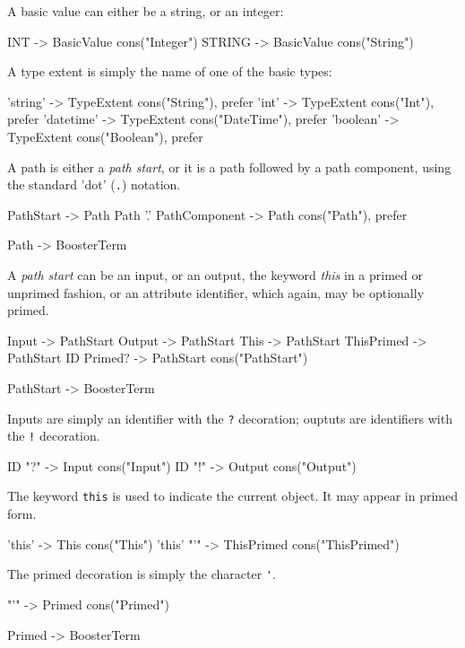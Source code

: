 A basic value can either be a string, or an integer:
\begin{code}
INT 		-> BasicValue {cons("Integer")}
STRING		-> BasicValue {cons("String")}
\end{code}

A type extent is simply the name of one of the basic types:
\begin{code}
'string'	-> TypeExtent {cons("String"), prefer}
'int'		-> TypeExtent {cons("Int"), prefer}
'datetime'	-> TypeExtent {cons("DateTime"), prefer}
'boolean'	-> TypeExtent {cons("Boolean"), prefer}
\end{code}

A path is either a \emph{path start}, or it is a path followed by a
path component, using the standard 'dot' (\verb|.|) notation.

\begin{code}
PathStart -> Path
Path '.' PathComponent -> Path {cons("Path"), prefer}

Path -> BoosterTerm
\end{code}

A \emph{path start} can be an input, or an output, the keyword
\emph{this} in a primed or unprimed fashion, or an attribute
identifier, which again, may be optionally primed.

\begin{code}
Input         -> PathStart
Output        -> PathStart
This          -> PathStart
ThisPrimed    -> PathStart
ID Primed? -> PathStart {cons("PathStart")}

PathStart     -> BoosterTerm
\end{code}

Inputs are simply an identifier with the \verb|?| decoration; ouptuts
are identifiers with the \verb|!| decoration.

\begin{code}
ID "?" -> Input {cons("Input")}
ID "!" -> Output {cons("Output")}
\end{code}

The keyword \verb|this| is used to indicate the current object.  It
may appear in primed form.

\begin{code}
'this' -> This {cons("This")}
'this' "'" -> ThisPrimed {cons("ThisPrimed")}
\end{code}

The primed decoration is simply the character \verb|'|.

\begin{code}
"'" -> Primed {cons("Primed")}
	
Primed -> BoosterTerm
\end{code}

